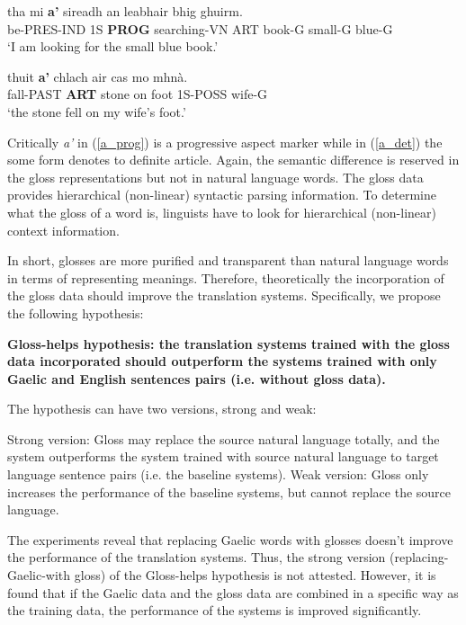 \documentclass[11pt,a4paper]{article}
\begin{document}
\begin{exe}  
\ex \label{a_prog}
\gll tha mi \textbf{a'} sireadh an leabhair bhig ghuirm.\\
be-PRES-IND 1S \textbf{PROG} searching-VN ART book-G small-G blue-G\\
\glt `I am looking for the small blue book.' \citep[p. 29]{lamb2001scottish}

\ex \label{a_det}
\gll thuit \textbf{a'} chlach air cas mo mhn\`a.\\
fall-PAST \textbf{ART} stone on foot 1S-POSS wife-G\\
\glt`the stone fell on my wife's foot.' \citep[p. 30]{lamb2001scottish} 	
\end{exe}

Critically \textit{a'} in (\ref{a_prog}) is a progressive aspect marker while in (\ref{a_det}) the some form denotes to definite article. Again, the semantic difference is reserved in the gloss representations but not in natural language words.  
The gloss data provides hierarchical (non-linear) syntactic parsing information. To determine what the gloss of a word is, linguists have to look for hierarchical (non-linear) context information.

In short, glosses are more purified and transparent than natural language words in terms of representing meanings. Therefore, theoretically the incorporation of the gloss data should improve the translation systems. Specifically, we propose the following hypothesis:

\begin{exe} 
\ex \textbf{Gloss-helps hypothesis: the translation systems trained with the gloss data incorporated should outperform the systems trained with only Gaelic and English sentences pairs (i.e. without gloss data).}\label{hypothesis}

The hypothesis can have two versions, strong and weak:
	\begin{xlist}
	\ex \label{strong_hy} Strong version: Gloss may replace the source natural language totally, and the system outperforms the system trained with source natural language to target language sentence pairs (i.e. the baseline systems).  
	\ex \label{weak_hy} Weak version: Gloss only increases the performance of the baseline systems, but cannot replace the source language.
	\end{xlist}
\end{exe}

The experiments reveal that replacing Gaelic words with glosses doesn't improve the performance of the translation systems. Thus, the strong version (replacing-Gaelic-with gloss) of the Gloss-helps hypothesis is not attested. However, it is found that if the Gaelic data and the gloss data are combined in a specific way as the training data, the performance of the systems is improved significantly. 
\end{document}
